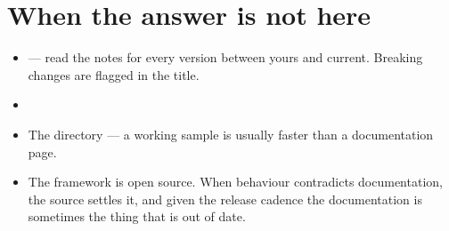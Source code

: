\section{When the answer is not here}

\begin{itemize}[leftmargin=1.4em]
\item {} --- read the notes for
      every version between yours and current. Breaking changes are flagged
      \code{[BREAKING]} in the title.
\item {}
\item The  directory --- a working sample is usually faster
      than a documentation page.
\item The framework is open source. When behaviour contradicts documentation, the
      source settles it, and given the release cadence the documentation is
      sometimes the thing that is out of date.
\end{itemize}
